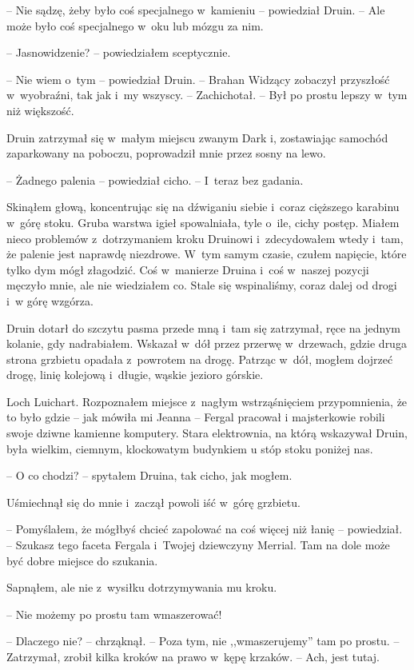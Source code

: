 \documentclass[oneside,polish,11pt,sfheadings]{mwbk}
\begin{document}
-- Nie sądzę, żeby było coś specjalnego w~kamieniu -- powiedział Druin. -- Ale może było coś specjalnego w~oku lub mózgu za nim.

-- Jasnowidzenie? -- powiedziałem sceptycznie.

-- Nie wiem o~tym -- powiedział Druin. -- Brahan Widzący zobaczył
przyszłość w~wyobraźni, tak jak i~my wszyscy. -- Zachichotał. -- Był po
prostu lepszy w~tym niż większość.

Druin zatrzymał się w~małym miejscu zwanym Dark i, zostawiając samochód
zaparkowany na poboczu, poprowadził mnie przez sosny na lewo.

-- Żadnego palenia -- powiedział cicho. -- I~teraz bez gadania.

Skinąłem głową, koncentrując się na dźwiganiu siebie i~coraz cięższego
karabinu w~górę stoku. Gruba warstwa igieł spowalniała, tyle o~ile,
cichy postęp. Miałem nieco problemów z~dotrzymaniem kroku Druinowi i~zdecydowałem wtedy i~tam, że palenie jest naprawdę niezdrowe. W~tym
samym czasie, czułem napięcie, które tylko dym mógł złagodzić. Coś w~manierze Druina i~coś w~naszej pozycji męczyło mnie, ale nie wiedziałem
co. Stale się wspinaliśmy, coraz dalej od drogi i~w górę wzgórza.

Druin dotarł do szczytu pasma przede mną i~tam się zatrzymał, ręce na
jednym kolanie, gdy nadrabiałem. Wskazał w~dół przez przerwę w~drzewach,
gdzie druga strona grzbietu opadała z~powrotem na drogę. Patrząc w~dół,
mogłem dojrzeć drogę, linię kolejową i~długie, wąskie jezioro górskie.

Loch Luichart. Rozpoznałem miejsce z~nagłym wstrząśnięciem
przypomnienia, że to było gdzie -- jak mówiła mi Jeanna -- Fergal pracował
i majsterkowie robili swoje dziwne kamienne komputery. Stara
elektrownia, na którą wskazywał Druin, była wielkim, ciemnym,
klockowatym budynkiem u stóp stoku poniżej nas.

-- O co chodzi? -- spytałem Druina, tak cicho, jak mogłem.

Uśmiechnął się do mnie i~zaczął powoli iść w~górę grzbietu.

-- Pomyślałem, że mógłbyś chcieć zapolować na coś więcej niż łanię -- powiedział. -- Szukasz tego faceta Fergala i~Twojej dziewczyny Merrial.
Tam na dole może być dobre miejsce do szukania.

Sapnąłem, ale nie z~wysiłku dotrzymywania mu kroku. 

-- Nie możemy po
prostu tam wmaszerować!

-- Dlaczego nie? -- chrząknął. -- Poza tym, nie ,,wmaszerujemy'' tam po
prostu. -- Zatrzymał, zrobił kilka kroków na prawo w~kępę krzaków. -- Ach,
jest tutaj.
\end{document}
